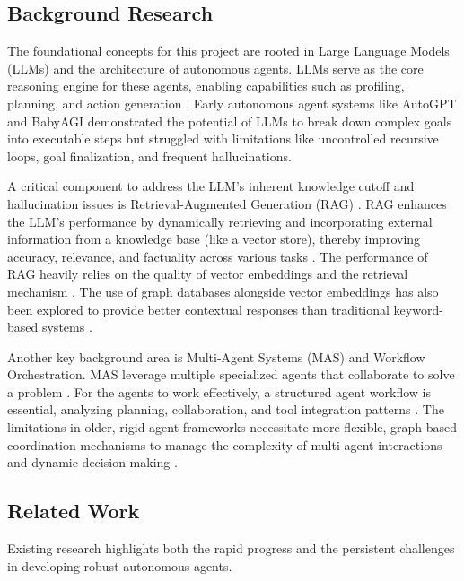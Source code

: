 \documentclass[lettersize,journal]{IEEEtran}
\begin{document}
\subsection{Background Research}

The foundational concepts for this project are rooted in Large Language Models (LLMs) and the architecture of autonomous agents. LLMs serve as the core reasoning engine for these agents, enabling capabilities such as profiling, planning, and action generation \cite{wang2024survey}. Early autonomous agent systems like AutoGPT and BabyAGI demonstrated the potential of LLMs to break down complex goals into executable steps but struggled with limitations like uncontrolled recursive loops, goal finalization, and frequent hallucinations.

A critical component to address the LLM’s inherent knowledge cutoff and hallucination issues is Retrieval-Augmented Generation (RAG) \cite{lewis2020retrieval}. RAG enhances the LLM’s performance by dynamically retrieving and incorporating external information from a knowledge base (like a vector store), thereby improving accuracy, relevance, and factuality across various tasks \cite{tural2024retrieval, bhupathi2025building}. The performance of RAG heavily relies on the quality of vector embeddings and the retrieval mechanism \cite{kukreja2024performance, mahmood2025azureiq}. The use of graph databases alongside vector embeddings has also been explored to provide better contextual responses than traditional keyword-based systems \cite{inani2025smart, liu2025graph}.

Another key background area is Multi-Agent Systems (MAS) and Workflow Orchestration. MAS leverage multiple specialized agents that collaborate to solve a problem \cite{guo2024large, zhang2025survey}. For the agents to work effectively, a structured agent workflow is essential, analyzing planning, collaboration, and tool integration patterns \cite{yu2025survey, blake2003coordinating}. The limitations in older, rigid agent frameworks necessitate more flexible, graph-based coordination mechanisms to manage the complexity of multi-agent interactions and dynamic decision-making \cite{wang2024agent, sapkota2025langchain}.

\subsection{Related Work}

Existing research highlights both the rapid progress and the persistent challenges in developing robust autonomous agents.
\end{document}

